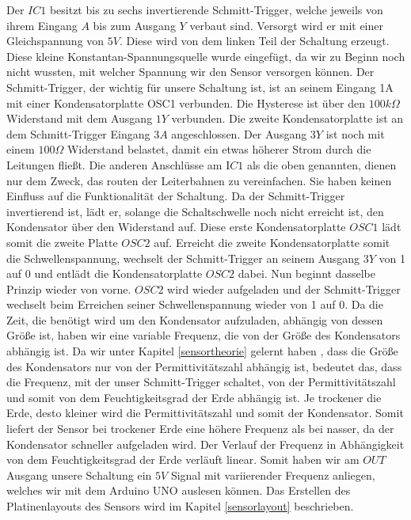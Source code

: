 Der $IC1$ besitzt bis zu sechs invertierende Schmitt-Trigger, welche jeweils von ihrem Eingang
$A$ bis zum Ausgang $Y$ verbaut sind. Versorgt wird er mit einer Gleichspannung von $5V$. Diese
wird von dem linken Teil der Schaltung erzeugt. Diese kleine Konstantan-Spannungsquelle
wurde eingefügt, da wir zu Beginn noch nicht wussten, mit welcher Spannung wir den Sensor
versorgen können. Der Schmitt-Trigger, der wichtig für unsere Schaltung ist, ist an seinem
Eingang 1A mit einer Kondensatorplatte OSC1 verbunden. Die Hysterese ist über den $100k\Omega$
Widerstand mit dem Ausgang $1Y$ verbunden. Die zweite Kondensatorplatte ist an dem
Schmitt-Trigger Eingang $3A$ angeschlossen. Der Ausgang $3Y$ ist noch mit einem $100\Omega$
Widerstand belastet, damit ein etwas höherer Strom durch die Leitungen fließt. Die anderen
Anschlüsse am I$C1$ als die oben genannten, dienen nur dem Zweck, das routen der
Leiterbahnen zu vereinfachen. Sie haben keinen Einfluss auf die Funktionalität der Schaltung.
Da der Schmitt-Trigger invertierend ist, lädt er, solange die Schaltschwelle noch nicht
erreicht ist, den Kondensator über den Widerstand auf. Diese erste Kondensatorplatte $OSC1$
lädt somit die zweite Platte $OSC2$ auf. Erreicht die zweite Kondensatorplatte somit die
Schwellenspannung, wechselt der Schmitt-Trigger an seinem Ausgang $3Y$ von 1 auf 0 und
entlädt die Kondensatorplatte $OSC2$ dabei. Nun beginnt dasselbe Prinzip wieder von vorne.
$OSC2$ wird wieder aufgeladen und der Schmitt-Trigger wechselt beim Erreichen seiner
Schwellenspannung wieder von 1 auf 0. Da die Zeit, die benötigt wird um den Kondensator
aufzuladen, abhängig von dessen Größe ist, haben wir eine variable Frequenz, die von der
Größe des Kondensators abhängig ist. Da wir unter Kapitel \ref{sensortheorie} gelernt haben
, dass die Größe des Kondensators nur von der Permittivitätszahl abhängig ist, bedeutet das, dass die
Frequenz, mit der unser Schmitt-Trigger schaltet, von der Permittivitätszahl und somit von
dem Feuchtigkeitsgrad der Erde abhängig ist. Je trockener die Erde, desto kleiner wird die
Permittivitätszahl und somit der Kondensator. Somit liefert der Sensor bei trockener Erde
eine höhere Frequenz als bei nasser, da der Kondensator schneller aufgeladen wird. Der
Verlauf der Frequenz in Abhängigkeit von dem Feuchtigkeitsgrad der Erde verläuft linear.
Somit haben wir am $OUT$ Ausgang unsere Schaltung ein $5V$ Signal mit variierender Frequenz
anliegen, welches wir mit dem Arduino UNO auslesen können.
Das Erstellen des Platinenlayouts des Sensors wird im Kapitel \ref{sensorlayout} beschrieben.

